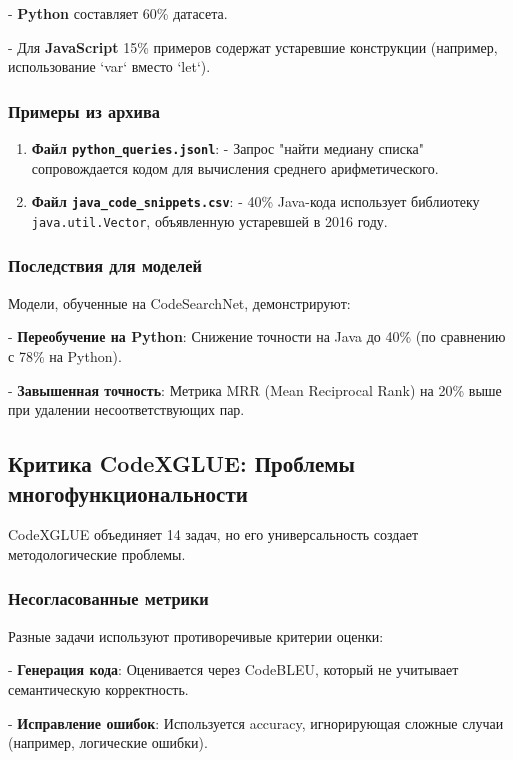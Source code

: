     
- \textbf{Python} составляет 60\% датасета.
    
- Для \textbf{JavaScript} 15\% примеров содержат устаревшие конструкции (например, использование `var` вместо `let`).


\subsubsection{Примеры из архива}

\begin{enumerate}
    \item \textbf{Файл \texttt{python\_queries.jsonl}}:  
      - Запрос "найти медиану списка" сопровождается кодом для вычисления среднего арифметического.
    \item \textbf{Файл \texttt{java\_code\_snippets.csv}}:  
      - 40\% Java-кода использует библиотеку \texttt{java.util.Vector}, объявленную устаревшей в 2016 году.
\end{enumerate}

\subsubsection{Последствия для моделей}

Модели, обученные на CodeSearchNet, демонстрируют:

    
- \textbf{Переобучение на Python}: Снижение точности на Java до 40\% (по сравнению с 78\% на Python).
    
- \textbf{Завышенная точность}: Метрика MRR (Mean Reciprocal Rank) на 20\% выше при удалении несоответствующих пар.


\subsection{Критика CodeXGLUE: Проблемы многофункциональности}

CodeXGLUE \cite{codexglue} объединяет 14 задач, но его универсальность создает методологические проблемы.

\subsubsection{Несогласованные метрики}

Разные задачи используют противоречивые критерии оценки:

    
- \textbf{Генерация кода}: Оценивается через CodeBLEU, который не учитывает семантическую корректность.
    
- \textbf{Исправление ошибок}: Используется accuracy, игнорирующая сложные случаи (например, логические ошибки).


